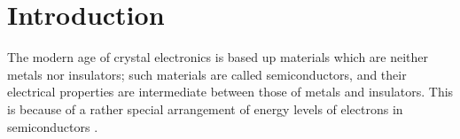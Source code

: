 \section{Introduction}
The modern age of crystal electronics is based up materials which are neither
metals nor insulators; such materials are called semiconductors, and their electrical properties are
intermediate between those of metals and insulators. This is because of a rather special arrangement of
energy levels of electrons in semiconductors \cite{phillips2012bonds}. 
